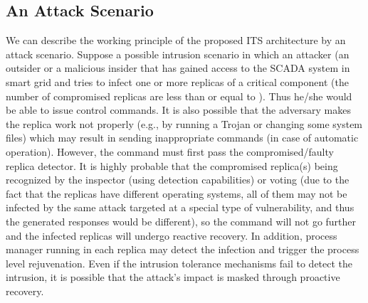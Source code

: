 \documentclass[preprint,number,12pt]{elsarticle}
\begin{document}
\subsection{An Attack Scenario}
We can describe the working principle of the proposed ITS architecture by an attack scenario. Suppose a possible intrusion scenario in which an attacker (an outsider or a malicious insider that has gained access to the SCADA system in smart grid and tries to infect one or more replicas of a critical component (the number of compromised replicas are less than or equal to ). Thus he/she would be able to issue control commands. It is also possible that the adversary makes the replica work not properly (e.g., by running a Trojan or changing some system files) which may result in sending inappropriate commands (in case of automatic operation). However, the command must first pass the compromised/faulty replica detector. It is highly probable that the compromised replica(s) being recognized by the inspector (using detection capabilities) or voting (due to the fact that the replicas have different operating systems, all of them may not be infected by the same attack targeted at a special type of vulnerability, and thus the generated responses would be different), so the command will not go further and the infected replicas will undergo reactive recovery. In addition, process manager running in each replica may detect the infection and trigger the process level rejuvenation. Even if the intrusion tolerance mechanisms fail to detect the intrusion, it is possible that the attack's impact is masked through proactive recovery.
\end{document}
